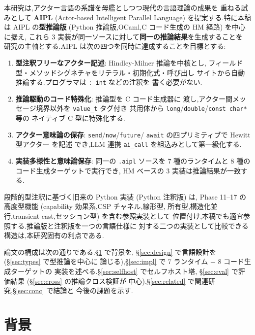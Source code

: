 \documentclass[11pt,a4paper]{article}
\newcommand{\code}[1]{\texttt{\small #1}}
\begin{document}
本研究は,アクター言語の系譜を母艦としつつ現代の言語理論の成果を
重ねる試みとして \textbf{AIPL} (Actor-based Intelligent Parallel
Language) を提案する.特に本稿は AIPL の\textbf{型推論版}
(Python 推論版,OCaml,C コード生成の HM 経路) を中心に据え,
これら 3 実装が同一ソースに対して\textbf{同一の推論結果}を生成することを
研究の主軸とする.AIPL は次の四つを同時に達成することを目標とする:

\begin{enumerate}[leftmargin=*]
  \item \textbf{型注釈フリーなアクター記述}: Hindley-Milner 推論を中核とし,
    フィールド型・メソッドシグネチャをリテラル・初期化式・呼び出し
    サイトから自動推論する.プログラマは \code{:~int} などの注釈を
    書く必要がない.
  \item \textbf{推論駆動のコード特殊化}: 推論型を C コード生成器に
    渡し,アクター間メッセージ境界以外を \code{value\_t} タグ付き
    共用体から \code{long}/\code{double}/\code{const char*} 等の
    ネイティブ C 型に特殊化する.
  \item \textbf{アクター意味論の保存}: \code{send}/\code{now}/\code{future}/
    \code{await} の四プリミティブで Hewitt 型アクター \cite{hewitt1973} を記述
    でき,LLM 連携 \code{ai\_call} を組込みとして第一級化する.
  \item \textbf{実装多様性と意味論保存}: 同一の \code{.aipl} ソースを
    7 種のランタイムと 8 種のコード生成ターゲットで実行でき,
    HM ベースの 3 実装は推論結果が一致する.
\end{enumerate}

段階的型注釈に基づく旧来の Python 実装 (Python 注釈版) は,
Phase 11--17 の高度型機能 (capability 効果系,CSP チャネル,線形型,
所有型,構造化並行,transient cast,セッション型) を含む参照実装として
位置付け,本稿でも適宜参照する.推論版と注釈版を一つの言語仕様に
対する二つの実装として比較できる構造は,本研究固有の利点である.

論文の構成は次の通りである.\S\ref{sec:bg} で背景を,
\S\ref{sec:design} で言語設計を (\S\ref{sec:types} で型推論を中心に
論じる),\S\ref{sec:impl} で 7 ランタイム + 8 コード生成ターゲットの
実装を述べる.\S\ref{sec:selfhost} でセルフホスト塔,
\S\ref{sec:eval} で評価結果 (\S\ref{sec:cross} の推論クロス検証が
中心),\S\ref{sec:related} で関連研究,\S\ref{sec:conc} で結論と
今後の課題を示す.

\section{背景}
\label{sec:bg}
\end{document}
